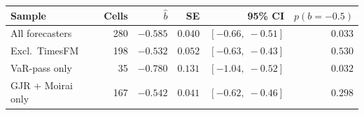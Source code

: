 \begin{tabular}{lrrrrr}
\toprule
Sample & Cells & $\hat{b}$ & SE & 95\% CI & $p(b{=}{-}0.5)$ \\
\midrule
  All forecasters & 280 & $-0.585$ & $0.040$ & $[-0.66,\;-0.51]$ & $0.033$ \\
  Excl.\ TimesFM & 198 & $-0.532$ & $0.052$ & $[-0.63,\;-0.43]$ & $0.530$ \\
  VaR-pass only & 35 & $-0.780$ & $0.131$ & $[-1.04,\;-0.52]$ & $0.032$ \\
  GJR + Moirai only & 167 & $-0.542$ & $0.041$ & $[-0.62,\;-0.46]$ & $0.298$ \\
\bottomrule
\end{tabular}